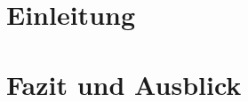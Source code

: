 \documentclass[
	12pt,
	BCOR=5mm,
	DIV=12,
	headinclude=on,
	footinclude=off,
	parskip=half,
	bibliography=totoc,
	listof=entryprefix,
	toc=listof,
	numbers=noenddot,
	plainfootsepline
]{scrreprt}
\begin{document}
\chapter{Einleitung}




\chapter{Fazit und Ausblick}

\clearpage
\ihead{}
\printbibliography[title=Literaturverzeichnis]
\cleardoublepage

\end{document}
